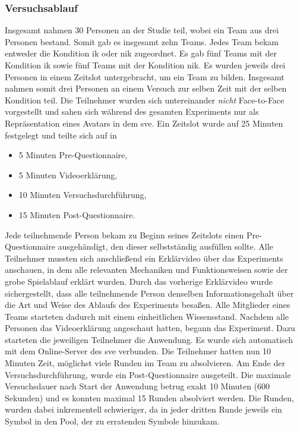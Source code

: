 \documentclass[a4paper,11pt]{article}%
\renewcommand{\\}{\vspace*{0.5\baselineskip} \newline}
\begin{document}
	\subsubsection{Versuchsablauf}
Insgesamt nahmen 30 Personen an der Studie teil, wobei ein Team aus drei Personen bestand. Somit gab es insgesamt zehn Teams. Jedes Team bekam entweder die Kondition \ac{ik} oder \ac{nik} zugeordnet. Es gab fünf Teams mit der Kondition \ac{ik} sowie fünf Teams mit der Kondition \ac{nik}.
Es wurden jeweils drei Personen in einem Zeitslot untergebracht, um ein Team zu bilden.
Insgesamt nahmen somit drei Personen an einem Versuch zur selben Zeit mit der selben Kondition teil. Die Teilnehmer wurden sich untereinander \textit{nicht} Face-to-Face vorgestellt und sahen sich während des gesamten Experiments nur als Repräsentation eines Avatars in dem \ac{sve}. 
Ein Zeitslot wurde auf 25 Minuten festgelegt und teilte sich auf in
		\begin{itemize}
			\item 5 Minuten Pre-Questionnaire,
			\item 5 Minuten Videoerklärung,
			\item 10 Minuten Versuchsdurchführung,
			\item 15 Minuten Post-Questionnaire.
		\end{itemize}
Jede teilnehmende Person bekam zu Beginn seines Zeitslots einen Pre-Questionnaire ausgehändigt, den dieser selbstständig ausfüllen sollte.
Alle Teilnehmer mussten sich anschließend ein Erklärvideo über das Experiments anschauen, in dem alle relevanten Mechaniken und Funktionsweisen sowie der grobe Spielablauf erklärt wurden. Durch das vorherige Erklärvideo wurde sichergestellt, dass alle teilnehmende Person denselben Informationsgehalt über die Art und Weise des Ablaufs des Experiments besaßen. Alle Mitglieder eines Teams starteten dadurch mit einem einheitlichen Wissensstand.
Nachdem alle Personen das Videoerklärung angeschaut hatten, begann das Experiment. Dazu starteten die jeweiligen Teilnehmer die Anwendung. Es wurde sich automatisch mit dem Online-Server des \ac{sve} verbunden. Die Teilnehmer hatten nun 10 Minuten Zeit, möglichst viele Runden im Team zu absolvieren.
	Am Ende der Versuchsdurchführung, wurde ein Post-Questionnaire ausgeteilt. 
Die maximale Versuchsdauer nach Start der Anwendung betrug exakt 10 Minuten (600 Sekunden) und es konnten maximal 15 Runden absolviert werden. Die Runden, wurden dabei inkrementell schwieriger, da in jeder dritten Runde jeweils ein Symbol in den Pool, der zu erratenden Symbole hinzukam. 
\end{document}
